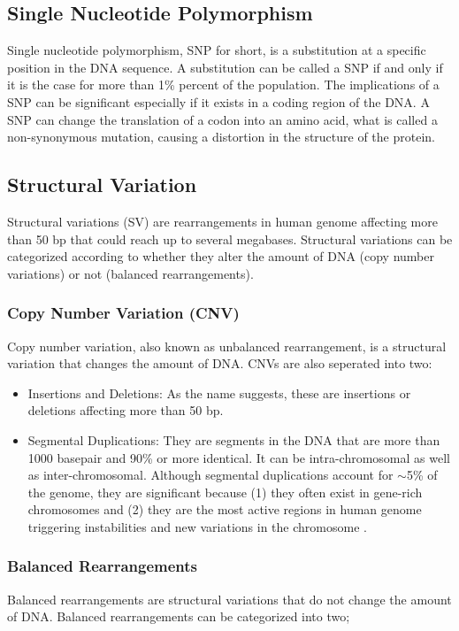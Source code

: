 \subsection{Single Nucleotide Polymorphism}
Single nucleotide polymorphism, SNP for short, is a substitution at a specific position in the DNA sequence. A substitution can be called a SNP if and only if it is the case for more than 1\% percent of the population. The implications of a SNP can be significant especially if it exists in a coding region of the DNA. A SNP can change the translation of a codon into an amino acid, what is called a non-synonymous mutation, causing a distortion in the structure of the protein. 


\subsection{Structural Variation}
Structural variations (SV) are rearrangements in human genome affecting more than 50 bp that could reach up to several megabases. Structural variations can be categorized according to whether they alter the amount of DNA (copy number variations) or not (balanced rearrangements). 

\subsubsection{Copy Number Variation (CNV)}
Copy number variation, also known as unbalanced rearrangement, is a structural variation that changes the amount of DNA. CNVs are also seperated into two:
\begin{itemize}
  \item Insertions and Deletions: As the name suggests, these are insertions or deletions affecting more than 50 bp.
  \item Segmental Duplications: They are segments in the DNA that are more than 1000 basepair and 90\% or more identical. It can be intra-chromosomal as well as inter-chromosomal. Although segmental duplications account for $\sim$5\% of the genome, they are significant because (1) they often exist in gene-rich chromosomes \cite{bailey2002recent} and (2) they are the most active regions in human genome triggering instabilities and new variations in the chromosome \cite{samonte2002segmental,sudmant2010diversity}.
\end{itemize}
\subsubsection{Balanced Rearrangements}
Balanced rearrangements are structural variations that do not change the amount of DNA. Balanced rearrangements can be categorized into two;

